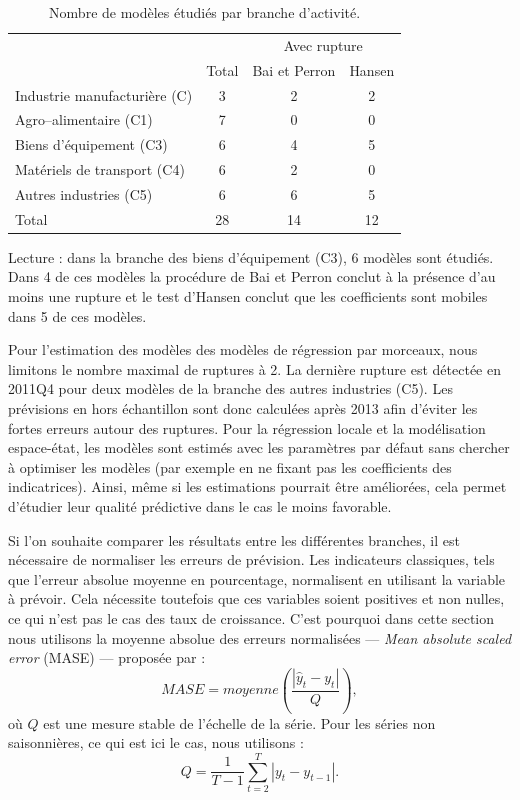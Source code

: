 \documentclass[
  a4paper,
  DIV=11,
  numbers=noendperiod,
  french]{scrartcl}
\newcommand\1{{\mathds 1}}
\theoremstyle{remark}
\begin{document}
\begin{longtable}{l|ccc}

\caption{\label{tbl-nb-models}Nombre de modèles étudiés par branche
d'activité.}

\tabularnewline

\toprule
\multicolumn{1}{l}{} &  & \multicolumn{2}{c}{Avec rupture} \\ 
\cmidrule(lr){3-4}
\multicolumn{1}{l}{} & Total & Bai et Perron & Hansen \\ 
\midrule\addlinespace[2.5pt]
Industrie manufacturière (C) & 3 & 2 & 2 \\ 
Agro–alimentaire (C1) & 7 & 0 & 0 \\ 
Biens d'équipement (C3) & 6 & 4 & 5 \\ 
Matériels de transport (C4) & 6 & 2 & 0 \\ 
Autres industries (C5) & 6 & 6 & 5 \\ 
\midrule 
\midrule 
Total & 28 & 14 & 12 \\ 
\bottomrule

\end{longtable}

Lecture : dans la branche des biens d'équipement (C3), 6 modèles sont
étudiés. Dans 4 de ces modèles la procédure de Bai et Perron conclut à
la présence d'au moins une rupture et le test d'Hansen conclut que les
coefficients sont mobiles dans 5 de ces modèles.

Pour l'estimation des modèles des modèles de régression par morceaux,
nous limitons le nombre maximal de ruptures à 2. La dernière rupture est
détectée en 2011Q4 pour deux modèles de la branche des autres industries
(C5). Les prévisions en hors échantillon sont donc calculées après 2013
afin d'éviter les fortes erreurs autour des ruptures. Pour la régression
locale et la modélisation espace-état, les modèles sont estimés avec les
paramètres par défaut sans chercher à optimiser les modèles (par exemple
en ne fixant pas les coefficients des indicatrices). Ainsi, même si les
estimations pourrait être améliorées, cela permet d'étudier leur qualité
prédictive dans le cas le moins favorable.

Si l'on souhaite comparer les résultats entre les différentes branches,
il est nécessaire de normaliser les erreurs de prévision. Les
indicateurs classiques, tels que l'erreur absolue moyenne en
pourcentage, normalisent en utilisant la variable à prévoir. Cela
nécessite toutefois que ces variables soient positives et non nulles, ce
qui n'est pas le cas des taux de croissance. C'est pourquoi dans cette
section nous utilisons la moyenne absolue des erreurs normalisées ---
\emph{Mean absolute scaled error} (MASE) --- proposée par
\textcite{HYNDMAN2006679} : \[
MASE=moyenne\left(\frac{|{\hat y}_{t} - y_t|}{Q}\right),
\] où \(Q\) est une mesure stable de l'échelle de la série. Pour les
séries non saisonnières, ce qui est ici le cas, nous utilisons : \[
Q=\frac{1}{T-1}\sum_{t=2}^T|y_t-y_{t-1}|.
\]
\end{document}
